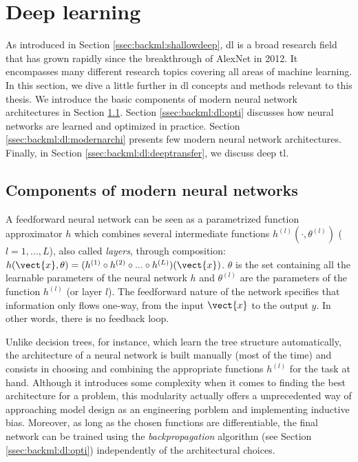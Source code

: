 \section{Deep learning}
\label{sec:backml:deeplearning}

As introduced in Section \ref{ssec:backml:shallowdeep}, \acrlong{dl} is a broad
research field that has grown rapidly since the breakthrough of AlexNet in 2012.
It encompasses many different research topics covering all areas of machine
learning. In this section, we dive a little further in \acrlong{dl} concepts and
methods relevant to this thesis. We introduce the basic components of modern neural
network architectures in Section \ref{ssec:backml:dp:components}. Section
\ref{ssec:backml:dl:opti} discusses how neural networks are learned and optimized
in practice. Section \ref{ssec:backml:dl:modernarchi} presents few modern neural
network architectures. Finally, in Section \ref{ssec:backml:dl:deeptransfer}, we
discuss deep \acrlong{tl}.

\subsection{Components of modern neural networks}
\label{ssec:backml:dp:components}

A feedforward neural network can be seen as a parametrized function approximator
$h$ which combines several intermediate functions $h^{(l)}(\cdot, \theta^{(l)})$
($l=1, ..., L$), also called \textit{layers}, through composition:
$h(\vect{x}, \theta) = (h^{(1)} \circ h^{(2)} \circ ... \circ h^{(L)})(\vect{x})$.
$\theta$ is the set containing all the learnable parameters of the neural network
$h$ and $\theta^{(l)}$ are the parameters of the function $h^{(l)}$ (or layer
$l$). The feedforward nature of the network specifies that information only flows
one-way, from the input $\vect{x}$ to the output $y$. In other words, there is no
feedback loop.

Unlike decision trees, for instance, which learn the tree structure automatically,
the architecture of a neural network is built manually (most of the time) and
consists in choosing and combining the appropriate functions $h^{(l)}$ for the
task at hand. Although it introduces some complexity when it comes to finding the
best architecture for a problem, this modularity actually offers a unprecedented
way of approaching model design as an engineering porblem and implementing inductive
bias. Moreover, as long as the chosen functions are differentiable, the final
network can be trained using the \textit{backpropagation} algorithm (see Section
\ref{ssec:backml:dl:opti}) independently of the architectural choices.


